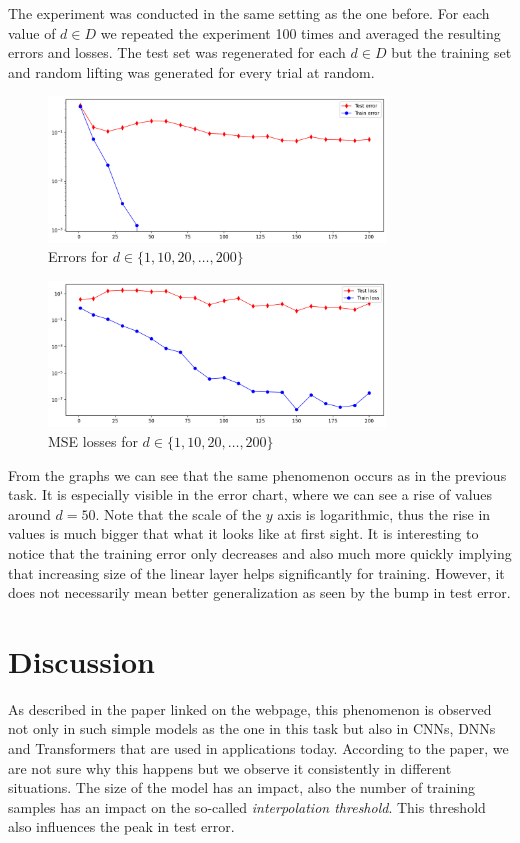 \documentclass[a4paper,11pt]{article}
\begin{document}
The experiment was conducted in the same setting as the one before.
For each value of $d \in D$ we repeated the experiment 100 times and averaged the resulting errors and losses.
The test set was regenerated for each $d \in D$ but the training set and random lifting was generated for every trial at random.

\begin{figure}[ht]
    \centering
    \includegraphics[width=0.8\textwidth]{../hidden_size/errors.png}
    \caption{Errors for $d \in \{1, 10, 20, \dots, 200\}$}
\end{figure}

\begin{figure}[ht]
    \centering
    \includegraphics[width=0.8\textwidth]{../hidden_size/losses.png}
    \caption{MSE losses for $d \in \{1, 10, 20, \dots, 200\}$}
\end{figure}

From the graphs we can see that the same phenomenon occurs as in the previous task.
It is especially visible in the error chart, where we can see a rise of values around $d=50$.
Note that the scale of the $y$ axis is logarithmic, thus the rise in values is much bigger that what it looks like at first sight.
It is interesting to notice that the training error only decreases and also much more quickly implying that increasing size of the linear layer helps significantly for training.
However, it does not necessarily mean better generalization as seen by the bump in test error.

\section{Discussion}
As described in the paper linked on the webpage, this phenomenon is observed not only in such simple models as the one in this task but also in CNNs, DNNs and Transformers that are used in applications today.
According to the paper, we are not sure why this happens but we observe it consistently in different situations.
The size of the model has an impact, also the number of training samples has an impact on the so-called \textit{interpolation threshold}.
This threshold also influences the peak in test error.
\end{document}
